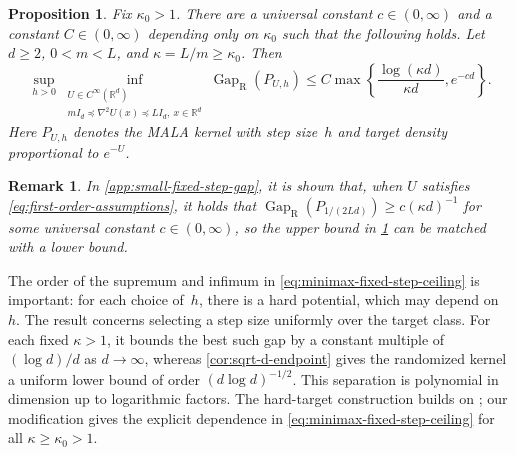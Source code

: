 \documentclass[11pt]{article}
\newtheorem{proposition}[proposition]{Proposition}
\newtheorem{remark}[remark]{Remark}
\newcommand{\R}{\mathbb R}
\newcommand{\Gap}{\operatorname{Gap}_{\mathrm{R}}}
\newcommand{\1}{\mathbf 1}
\newcommand{\df}{\mathrm{d}}
\begin{document}
	\begin{proposition}
		\label{prop:minimax-fixed-step-ceiling}
		Fix $\kappa_0>1$.  There are a universal constant $c \in (0,\infty)$ and a
		constant $C \in (0,\infty)$ depending only on $\kappa_0$ such that the
		following holds.  Let $d\geq2$, $0<m<L$, and
		$\kappa=L/m\geq\kappa_0$.  Then
		\begin{equation}
			\label{eq:minimax-fixed-step-ceiling}
			\sup_{h>0}
			\inf_{\substack{U\in C^\infty(\R^d)\\
					mI_d\preceq\nabla^2U(x)\preceq LI_d,\ x\in\R^d}}
			\Gap(P_{U,h})
			\leq
			C\max\left\{
			\frac{\log(\kappa d)}{\kappa d},
			e^{-cd}
			\right\}.
		\end{equation}
		Here $P_{U,h}$ denotes the MALA kernel with step size~$h$ and
		target density proportional to $e^{-U}$.
	\end{proposition}
	
	\begin{remark} \label{rem:minimax-fixed-step-ceiling}
		In \cref{app:small-fixed-step-gap}, it is shown that, when $U$ satisfies \eqref{eq:first-order-assumptions}, it holds that $\Gap(P_{1/(2Ld)}) \geq c (\kappa d)^{-1}$ for some universal constant $c \in (0,\infty)$, so the upper bound in \cref{prop:minimax-fixed-step-ceiling} can be matched with a lower bound.
	\end{remark}
	
	The order of the supremum and infimum in
	\eqref{eq:minimax-fixed-step-ceiling} is important: for each choice
	of~$h$, there is a hard potential, which may depend on~$h$.
	The result concerns selecting a step size uniformly over the target
	class. For each fixed $\kappa>1$, it bounds the best such gap by a
	constant multiple of $(\log d)/d$ as $d\to\infty$, whereas
	\cref{cor:sqrt-d-endpoint} gives the randomized kernel a uniform lower
	bound of order $(d\log d)^{-1/2}$. This separation is polynomial in
	dimension up to logarithmic factors. The hard-target construction builds
	on \citet{ChewiEtAl2021,LeeShenTian2021,WuSchmidlerChen2022}; our
	modification gives the explicit dependence in
	\eqref{eq:minimax-fixed-step-ceiling} for all $\kappa\geq\kappa_0>1$.
	
	
\end{document}

